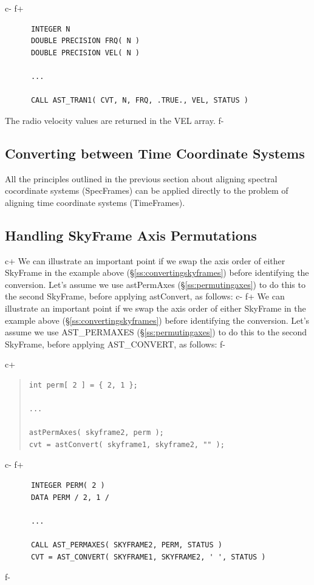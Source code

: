 \documentclass[twoside,11pt]{article}
\newcommand{\secref}[1]{\S\ref{#1}}
\newcommand{\secref}[1]{\ref{#1}}
\begin{document}
c-
f+
\small
\begin{verbatim}
      INTEGER N
      DOUBLE PRECISION FRQ( N )
      DOUBLE PRECISION VEL( N )

      ...

      CALL AST_TRAN1( CVT, N, FRQ, .TRUE., VEL, STATUS )
\end{verbatim}
\normalsize

The radio velocity values are returned in the VEL array.
f-

\subsection{Converting between Time Coordinate Systems}
All the principles outlined in the previous section about aligning
spectral cocordinate systems (SpecFrames) can be applied directly to the 
problem of aligning time coordinate systems (TimeFrames).

\subsection{\label{ss:convertingpermutedaxes}Handling SkyFrame Axis Permutations}

c+
We can illustrate an important point if we swap the axis order of
either SkyFrame in the example above (\secref{ss:convertingskyframes})
before identifying the conversion. Let's assume we use astPermAxes
(\secref{ss:permutingaxes}) to do this to the second SkyFrame, before
applying astConvert, as follows:
c-
f+
We can illustrate an important point if we swap the axis order of
either SkyFrame in the example above (\secref{ss:convertingskyframes})
before identifying the conversion. Let's assume we use AST\_PERMAXES
(\secref{ss:permutingaxes}) to do this to the second SkyFrame, before
applying AST\_CONVERT, as follows:
f-

c+
\begin{quote}
\small
\begin{verbatim}
int perm[ 2 ] = { 2, 1 };

...

astPermAxes( skyframe2, perm );
cvt = astConvert( skyframe1, skyframe2, "" );
\end{verbatim}
\normalsize
\end{quote}
c-
f+
\small
\begin{verbatim}
      INTEGER PERM( 2 )
      DATA PERM / 2, 1 /

      ...

      CALL AST_PERMAXES( SKYFRAME2, PERM, STATUS )
      CVT = AST_CONVERT( SKYFRAME1, SKYFRAME2, ' ', STATUS )
\end{verbatim}
\normalsize
f-
\end{document}
